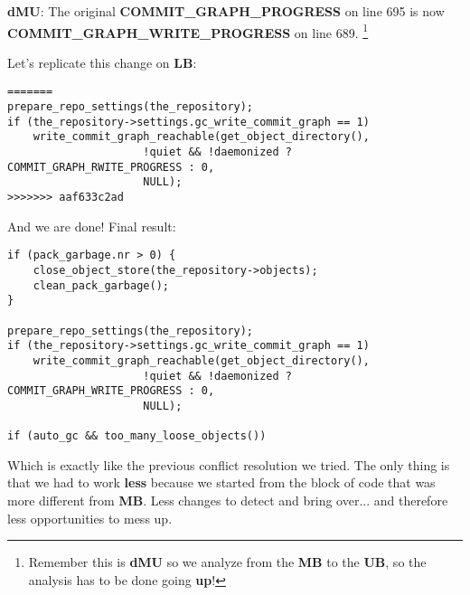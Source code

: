 {\bf dMU}: The original {\bf COMMIT\_GRAPH\_PROGRESS} on line 695 is now {\bf COMMIT\_GRAPH\_WRITE\_PROGRESS} on line 689.
\footnote{Remember this is {\bf dMU} so we analyze from the {\bf MB} to the {\bf UB}, so the analysis has to be done
going {\bf up}!}

Let's replicate this change on {\bf LB}:

\begin{lstlisting}[style=c_style,
	basicstyle=\tiny,
	firstnumber=698,
	caption={\bf example 5} - Step 1]
=======
prepare_repo_settings(the_repository);
if (the_repository->settings.gc_write_commit_graph == 1)
	write_commit_graph_reachable(get_object_directory(),
				     !quiet && !daemonized ? COMMIT_GRAPH_RWITE_PROGRESS : 0,
				     NULL);
>>>>>>> aaf633c2ad
\end{lstlisting}

And we are done! Final result:
\begin{lstlisting}[style=c_style,
	basicstyle=\tiny,
	firstnumber=681,
	caption={\bf example 5} - final result]
if (pack_garbage.nr > 0) {
	close_object_store(the_repository->objects);
	clean_pack_garbage();
}

prepare_repo_settings(the_repository);
if (the_repository->settings.gc_write_commit_graph == 1)
	write_commit_graph_reachable(get_object_directory(),
				     !quiet && !daemonized ? COMMIT_GRAPH_WRITE_PROGRESS : 0,
				     NULL);

if (auto_gc && too_many_loose_objects())
\end{lstlisting}

Which is exactly like the previous conflict resolution we tried. The only thing is that we had to work {\bf less} because
we started from the block of code that was more different from {\bf MB}. Less changes to detect and bring
over... and therefore less opportunities to mess up.

